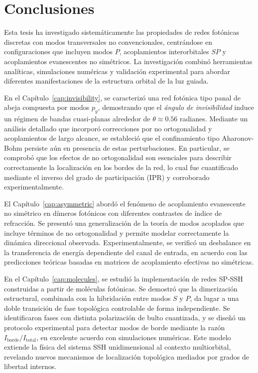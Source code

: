 \chapter{Conclusiones}
\label{cap:conclu}

Esta tesis ha investigado sistemáticamente las propiedades de redes fotónicas discretas con modos transversales no convencionales, centrándose en configuraciones que incluyen modos \( P \), acoplamientos interorbitales \( SP \) y acoplamientos evanescentes no simétricos. La investigación combinó herramientas analíticas, simulaciones numéricas y validación experimental para abordar diferentes manifestaciones de la estructura orbital de la luz guiada.

En el Capítulo~\ref{cap:invisibility}, se caracterizó una red fotónica tipo panal de abeja compuesta por modos \( p_y \), demostrando que el \textit{ángulo de invisibilidad} induce un régimen de bandas cuasi-planas alrededor de \( \theta \approx 0.56 \) radianes. Mediante un análisis detallado que incorporó correcciones por no ortogonalidad y acoplamientos de largo alcance, se estableció que el confinamiento tipo Aharonov-Bohm persiste aún en presencia de estas perturbaciones. En particular, se comprobó que los efectos de no ortogonalidad son esenciales para describir correctamente la localización en los bordes de la red, lo cual fue cuantificado mediante el inverso del grado de participación (IPR) y corroborado experimentalmente.

El Capítulo~\ref{cap:asymmetric} abordó el fenómeno de acoplamiento evanescente no simétrico en dímeros fotónicos con diferentes contrastes de índice de refracción. Se presentó una generalización de la teoría de modos acoplados que incluye términos de no ortogonalidad y permite modelar correctamente la dinámica direccional observada. Experimentalmente, se verificó un desbalance en la transferencia de energía dependiente del canal de entrada, en acuerdo con las predicciones teóricas basadas en matrices de acoplamiento efectivas no simétricas.

En el Capítulo~\ref{cap:molecules}, se estudió la implementación de redes SP-SSH construidas a partir de moléculas fotónicas. Se demostró que la dimerización estructural, combinada con la hibridación entre modos \( S \) y \( P \), da lugar a una doble transición de fase topológica controlable de forma independiente. Se identificaron fases con distinta polarización de bulto cuantizada, y se diseñó un protocolo experimental para detectar modos de borde mediante la razón \( I_{\text{borde}} / I_{\text{total}} \), en excelente acuerdo con simulaciones numéricas. Este modelo extiende la física del sistema SSH unidimensional al contexto multiorbital, revelando nuevos mecanismos de localización topológica mediados por grados de libertad internos.

